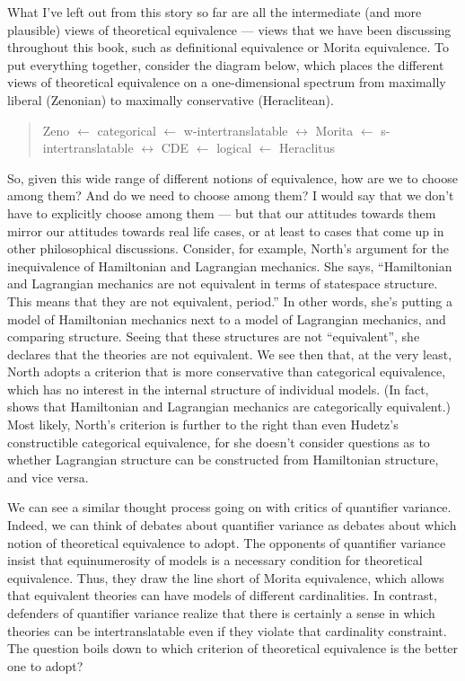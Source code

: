 What I've left out from this story so far are all the intermediate
(and more plausible) views of theoretical equivalence --- views that
we have been discussing throughout this book, such as definitional
equivalence or Morita equivalence.  To put everything together,
consider the diagram below, which places the different views of
theoretical equivalence on a one-dimensional spectrum from maximally
liberal (Zenonian) to maximally conservative (Heraclitean).
\begin{quote} Zeno $\leftarrow$ categorical $\leftarrow$
  w-intertranslatable $\leftrightarrow$ Morita $\leftarrow$
  s-intertranslatable $\leftrightarrow$ CDE $\leftarrow$ logical
  $\leftarrow$ Heraclitus \end{quote} So, given this wide range of
different notions of equivalence, how are we to choose among them?
And do we need to choose among them?  I would say that we don't have
to explicitly choose among them --- but that our attitudes towards
them mirror our attitudes towards real life cases, or at least to
cases that come up in other philosophical discussions.  Consider, for
example, North's \citeyearpar{north2009} argument for the
inequivalence of Hamiltonian and Lagrangian mechanics.  She says,
``Hamiltonian and Lagrangian mechanics are not equivalent in terms of
statespace structure.  This means that they are not equivalent,
period.''  In other words, she's putting a model of Hamiltonian
mechanics next to a model of Lagrangian mechanics, and comparing
structure.  Seeing that these structures are not ``equivalent'', she
declares that the theories are not equivalent.  We see then that, at
the very least, North adopts a criterion that is more conservative
than categorical equivalence, which has no interest in the internal
structure of individual models.  (In fact, \cite{barrett-hamiltonian}
shows that Hamiltonian and Lagrangian mechanics are categorically
equivalent.)  Most likely, North's criterion is further to the right
than even Hudetz's constructible categorical equivalence, for she
doesn't consider questions as to whether Lagrangian structure can be
constructed from Hamiltonian structure, and vice versa.

We can see a similar thought process going on with critics of
quantifier variance.  Indeed, we can think of debates about quantifier
variance as debates about which notion of theoretical equivalence to
adopt.  The opponents of quantifier variance insist that
equinumerosity of models is a necessary condition for theoretical
equivalence.  Thus, they draw the line short of Morita equivalence,
which allows that equivalent theories can have models of different
cardinalities.  In contrast, defenders of quantifier variance
realize that there is certainly a sense in which theories can be
intertranslatable even if they violate that cardinality constraint.
The question boils down to which criterion of theoretical equivalence
is the better one to adopt?

